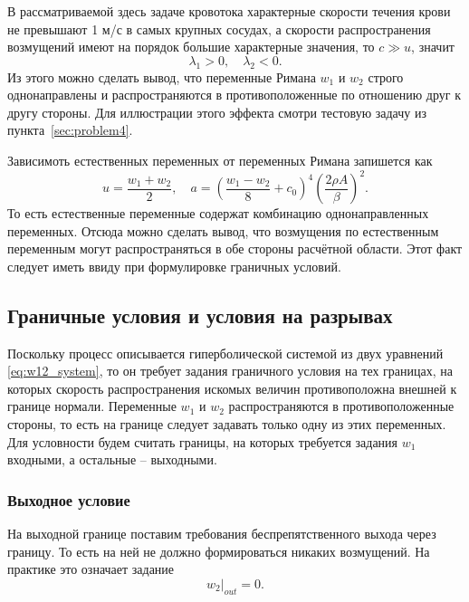 В рассматриваемой здесь задаче кровотока характерные
скорости течения крови не превышают 1 м/с в самых крупных сосудах,
а скорости распространения возмущений имеют на порядок большие характерные значения, то $c \gg u$,
значит
\begin{equation}
\nonumber
\lambda_1 > 0, \quad \lambda_2 < 0.
\end{equation}
Из этого можно сделать вывод, что
переменные Римана $w_1$  и $w_2$ строго однонаправлены и распространяются в противоположенные по отношению друг к другу стороны.
Для иллюстрации этого эффекта смотри тестовую задачу из пункта~\ref{sec:problem4}.

Зависимоть естественных переменных от переменных Римана запишется как
\begin{equation}
\label{eq:ua_from_w}
u = \frac{w_1 + w_2}{2}, \quad
a = \left(\frac{w_1 - w_2}{8} + c_0\right)^{4} \left(\frac{2\rho A}{\beta}\right)^2.
\end{equation}
То есть естественные переменные содержат комбинацию однонаправленных переменных. Отсюда
можно сделать вывод, что возмущения по естественным переменным могут распространяться
в обе стороны расчётной области. Этот факт следует иметь ввиду при формулировке граничных условий.

\subsection{Граничные условия и условия на разрывах}
Поскольку процесс описывается гиперболической системой из двух уравнений \cref{eq:w12_system},
то он требует задания граничного условия на тех границах,
на которых скорость распространения искомых величин противоположна внешней к границе нормали.
Переменные $w_1$ и $w_2$ распространяются в противоположенные стороны, то есть
на границе следует задавать только одну из этих переменных.
Для условности будем считать границы, на которых требуется задания $w_1$ входными,
а остальные -- выходными.

\subsubsection{Выходное условие}
На выходной границе поставим требования беспрепятственного выхода через границу.
То есть на ней не должно формироваться никаких возмущений. На практике это означает задание
\begin{equation}
\label{eq:outflow_w2}
\left.w_2\right|_{out} = 0.
\end{equation}

